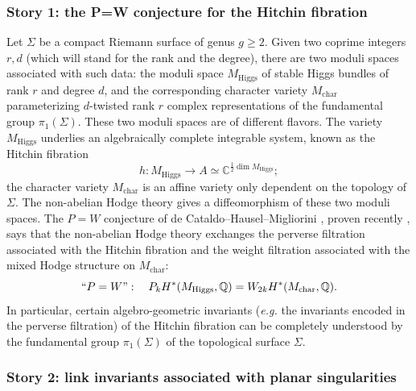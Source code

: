 \documentclass{pspum-l}
\theoremstyle{plain}
\theoremstyle{definition}
\theoremstyle{remark}
\newcommand{\BC}{{\mathbb{C}}}
\newcommand{\BQ}{{\mathbb{Q}}}
\begin{document}
\subsubsection{Story 1: the P=W conjecture for the Hitchin fibration}\label{sec2.3.1}
Let $\Sigma$ be a compact Riemann surface of genus $g\geq 2$. Given two coprime integers $r,d$ (which will stand for the rank and the degree), there are two moduli spaces associated with such data: the moduli space $M_{\mathrm{Higgs}}$ of stable Higgs bundles of rank $r$ and degree $d$, and the corresponding character variety $M_{\mathrm{char}}$ parameterizing $d$-twisted rank $r$ complex representations of the fundamental group $\pi_1(\Sigma)$. These two moduli spaces are of different flavors. The variety $M_{\mathrm{Higgs}}$ underlies an algebraically complete integrable system, known as the Hitchin fibration
\[
h: M_{\mathrm{Higgs}} \to A \simeq \BC^{\frac{1}{2} \dim M_{\mathrm{Higgs}}};
\]
the character variety $M_{\mathrm{char}}$ is an affine variety only dependent on the topology of $\Sigma$. The non-abelian Hodge theory gives a diffeomorphism of these two moduli spaces. The $P=W$ conjecture of de Cataldo--Hausel--Migliorini \cite{dCHM}, proven recently \cite{MS_PW, HMMS, MSY}, says that the non-abelian Hodge theory exchanges the perverse filtration associated with the Hitchin fibration and the weight filtration associated with the mixed Hodge structure on $M_{\mathrm{char}}$:
\begin{equation}\label{P=W_conj}
``P=W": \quad P_kH^*(M_{\mathrm{Higgs}}, \BQ) = W_{2k} H^*(M_{\mathrm{char}}, \BQ).
\end{equation}
In particular, certain algebro-geometric invariants (\emph{e.g.} the invariants encoded in the perverse filtration) of the Hitchin fibration can be completely understood by the fundamental group $\pi_1(\Sigma)$ of the topological surface $\Sigma$.


\subsubsection{Story 2: link invariants associated with planar singularities}\label{sec2.3.2}
\end{document}
